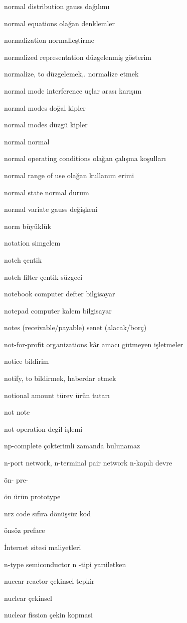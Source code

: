 \documentclass[12pt,fleqn]{article}\usepackage{../../common}
\begin{document}
normal distribution gauss dağılımı

normal equations olağan denklemler

normalization normalleştirme

normalized representation düzgelenmiş gösterim

normalize, to düzgelemek,. normalize etmek

normal mode interference uçlar arası karışım

normal modes doğal kipler

normal modes düzgü kipler

normal normal

normal operating conditions olağan çalışma koşulları

normal range of use olağan kullanım erimi

normal state normal durum

normal variate gauss değişkeni

norm büyüklük

notation simgelem

notch çentik

notch filter çentik süzgeci

notebook computer defter bilgisayar

notepad computer kalem bilgisayar

notes (receivable/payable) senet (alacak/borç)

not-for-profit organizations kâr amacı gütmeyen işletmeler

notice bildirim

notify, to bildirmek, haberdar etmek

notional amount türev ürün tutarı

not note

not operation degil işlemi

np-complete çokterimli zamanda bulunamaz

n-port network, n-terminal pair network n-kapılı devre

ön- pre-

ön ürün prototype

nrz code sıfıra dönüşsüz kod

önsöz preface

İnternet sitesi maliyetleri

n-type semiconductor n -tipi yarıiletken

nucear reactor çekinsel tepkir

nuclear çekinsel

nuclear fission çekin kopmasi
\end{document}
